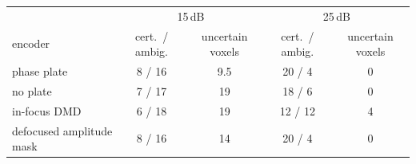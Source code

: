 \begin{tabular}{@{}l cc cc@{}}\toprule
 & \multicolumn{2}{c}{15\,dB} & \multicolumn{2}{c}{25\,dB}\\
encoder & cert.\ / ambig. & uncertain voxels & cert.\ / ambig. & uncertain voxels\\\midrule
phase plate & 8 / 16 & 9.5 & 20 / 4 & 0\\
no plate & 7 / 17 & 19 & 18 / 6 & 0\\
in-focus DMD & 6 / 18 & 19 & 12 / 12 & 4\\
defocused amplitude mask & 8 / 16 & 14 & 20 / 4 & 0\\
\bottomrule\end{tabular}
